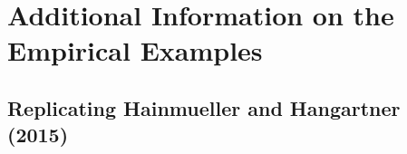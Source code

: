 \documentclass[12pt]{article}
\begin{document}
\clearpage





\section{Additional Information on the Empirical Examples}

\subsection{Replicating Hainmueller and Hangartner (2015)}
\end{document}
